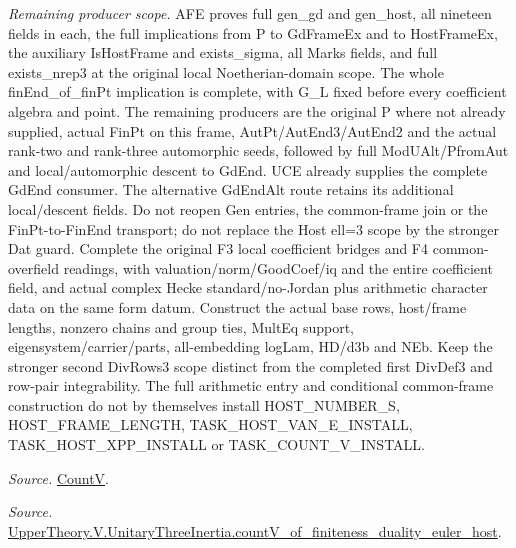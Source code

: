 \documentclass[11pt,a4paper]{article}
\numberwithin{equation}{section}
\theoremstyle{remark}\newtheorem{remark}[theorem]{Remark}
\begin{document}
\emph{Remaining producer scope.} AFE proves full gen\_\allowbreak gd and gen\_\allowbreak host, all nineteen fields in each, the full implications from P to GdFrameEx and to HostFrameEx, the auxiliary IsHostFrame and exists\_\allowbreak sigma, all Marks fields, and full exists\_\allowbreak nrep3 at the original local Noetherian-domain scope. The whole finEnd\_\allowbreak of\_\allowbreak finPt implication is complete, with G\_\allowbreak L fixed before every coefficient algebra and point. The remaining producers are the original P where not already supplied, actual FinPt on this frame, AutPt/AutEnd3/AutEnd2 and the actual rank-two and rank-three automorphic seeds, followed by full ModUAlt/PfromAut and local/automorphic descent to GdEnd. UCE already supplies the complete GdEnd consumer. The alternative GdEndAlt route retains its additional local/descent fields. Do not reopen Gen entries, the common-frame join or the FinPt-to-FinEnd transport; do not replace the Host ell=3 scope by the stronger Dat guard. Complete the original F3 local coefficient bridges and F4 common-overfield readings, with valuation/norm/GoodCoef/iq and the entire coefficient field, and actual complex Hecke standard/no-Jordan plus arithmetic character data on the same form datum. Construct the actual base rows, host/frame lengths, nonzero chains and group ties, MultEq support, eigensystem/carrier/parts, all-embedding logLam, HD/d3b and NEb. Keep the stronger second DivRows3 scope distinct from the completed first DivDef3 and row-pair integrability. The full arithmetic entry and conditional common-frame construction do not by themselves install HOST\_\allowbreak NUMBER\_\allowbreak S, HOST\_\allowbreak FRAME\_\allowbreak LENGTH, TASK\_\allowbreak HOST\_\allowbreak VAN\_\allowbreak E\_\allowbreak INSTALL, TASK\_\allowbreak HOST\_\allowbreak XPP\_\allowbreak INSTALL or TASK\_\allowbreak COUNT\_\allowbreak V\_\allowbreak INSTALL.

\emph{Source.} \href{https://github.com/CocoSgt/riemann-hypothesis-lean/blob/7cbf7a0c32fca1badf05931879a37c3f8a2b03b4/src/Development/AutomorphicArithmetic/AutomorphicVarieties/HeightAndVanishing/Counts.lean#L69-L69}{CountV}.

\emph{Source.} \href{https://github.com/CocoSgt/riemann-hypothesis-lean/blob/7cbf7a0c32fca1badf05931879a37c3f8a2b03b4/src/Development/AutomorphicArithmetic/AutomorphicVarieties/ModularityArgument/ThresholdArguments/DenseThresholdCases/CountVOf.lean#L33-L60}{UpperTheory.V.UnitaryThreeInertia.countV\_\allowbreak of\_\allowbreak finiteness\_\allowbreak duality\_\allowbreak euler\_\allowbreak host}.
\end{document}
